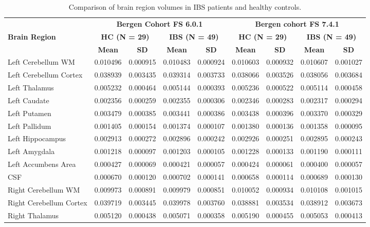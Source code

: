 \documentclass[diagnostics,article,accept,pdftex,moreauthors]{Definitions/mdpi}
\begin{document}
\begin{table}[H]
\caption{Comparison of brain region volumes in IBS patients and healthy controls.}
\begin{tabular}{lcccccccc}
\toprule
 & \multicolumn{4}{c}{\textbf{Bergen Cohort FS 6.0.1}} & \multicolumn{4}{c}{\textbf{Bergen cohort FS 7.4.1}} \\
\textbf{Brain Region} & \multicolumn{2}{c}{\textbf{HC (N = 29)}} & \multicolumn{2}{c}{\textbf{IBS (N = 49)}} & \multicolumn{2}{c}{\textbf{HC (N = 29)}} & \multicolumn{2}{c}{\textbf{IBS (N = 49)}} \\
  & \textbf{Mean} & \textbf{SD} & \textbf{Mean} & \textbf{SD} & \textbf{Mean} & \textbf{SD} & \textbf{Mean} & \textbf{SD} \\
\midrule
Left Cerebellum WM & 0.010496 & 0.000915 & 0.010483 & 0.000924 & 0.010603 & 0.000932 & 0.010607 & 0.001027 \\
Left Cerebellum Cortex & 0.038939 & 0.003435 & 0.039314 & 0.003733 & 0.038066 & 0.003526 & 0.038056 & 0.003684 \\
Left Thalamus & 0.005232 & 0.000464 & 0.005144 & 0.000393 & 0.005236 & 0.000522 & 0.005114 & 0.000458 \\
Left Caudate & 0.002356 & 0.000259 & 0.002355 & 0.000306 & 0.002346 & 0.000283 & 0.002317 & 0.000294 \\
Left Putamen & 0.003479 & 0.000385 & 0.003441 & 0.000386 & 0.003438 & 0.000396 & 0.003370 & 0.000329 \\
Left Pallidum & 0.001405 & 0.000154 & 0.001374 & 0.000107 & 0.001380 & 0.000136 & 0.001358 & 0.000095 \\
Left Hippocampus & 0.002913 & 0.000272 & 0.002896 & 0.000242 & 0.002926 & 0.000251 & 0.002895 & 0.000243 \\
Left Amygdala & 0.001218 & 0.000097 & 0.001203 & 0.000105 & 0.001228 & 0.000133 & 0.001190 & 0.000111 \\
Left Accumbens Area & 0.000427 & 0.000069 & 0.000421 & 0.000057 & 0.000424 & 0.000061 & 0.000400 & 0.000057 \\
CSF & 0.000670 & 0.000120 & 0.000702 & 0.000141 & 0.000658 & 0.000114 & 0.000689 & 0.000130 \\
Right Cerebellum WM & 0.009973 & 0.000891 & 0.009979 & 0.000851 & 0.010052 & 0.000934 & 0.010108 & 0.001015 \\
Right Cerebellum Cortex & 0.039719 & 0.003445 & 0.039978 & 0.003760 & 0.038881 & 0.003534 & 0.038912 & 0.003673 \\
Right Thalamus & 0.005120 & 0.000438 & 0.005071 & 0.000358 & 0.005190 & 0.000455 & 0.005053 & 0.000413 \\

\end{tabular}
\end{table}
\end{document}
